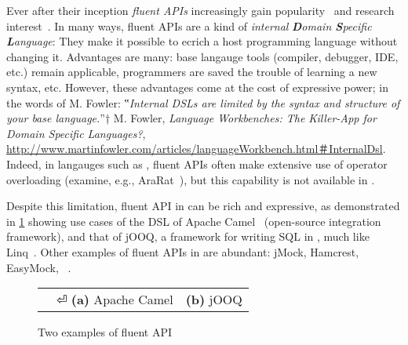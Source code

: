 Ever after their inception \emph{fluent APIs}
  increasingly gain popularity~\cite{Bauer:2005,Freeman:Pryce:06,Larsen:2012} and research
  interest~\cite{Deursen:2000,Kabanov:2008}.
In many ways, fluent APIs are a kind of
  \emph{internal} \emph{\textbf Domain \textbf Specific \textbf Language}:
They make it possible to ecrich a host programming language without changing it.
Advantages are many: base langauge tools (compiler, debugger, IDE, etc.) remain
  applicable, programmers are saved the trouble of learning a new syntax, etc.
However, these advantages come at the cost of expressive power;
  in the words of M. Fowler:
  ‟\emph{Internal DSLs are limited by the syntax and structure of your base language.}”†
  {M. Fowler,
    \emph{Language Workbenches: The Killer-App for Domain Specific Languages?},
  \url{http://www.martinfowler.com/articles/languageWorkbench.html＃InternalDsl}.}
Indeed, in langauges such as \CC{}, fluent APIs
  often make extensive use of operator overloading (examine, e.g., \textsf{AraRat}~\cite{Gil:Lenz:07}),
  but this capability is not available in \Java.

Despite this limitation, fluent API in \Java can be rich and expressive, as demonstrated
  in \cref{Figure:DSL} showing use cases of the DSL of Apache Camel~\cite{Ibsen:Anstey:10}
(open-source integration framework),
and that of jOOQ, a framework for writing
  SQL in \Java, much like Linq~\cite{Meijer:Beckman:Bierman:06}.
Other examples of fluent APIs in \Java are abundant: 
  jMock\cite{Freeman:Pryce:06}, 
  Hamcrest,
  EasyMock,
  ~\cite{find:manY:more:and:put:urlref:to:these}.

\begin{figure}[H]
  \caption{\label{Figure:DSL} Two examples of \Java fluent API}
  \begin{tabular}{@{}c@{}c@{}}
    \parbox[c]{44ex}{} &
    \hspace{-3ex} \parbox[c]{59ex}{} ⏎
    \textbf{(a)} Apache Camel                                          & \textbf{(b)} jOOQ
  \end{tabular}
\end{figure}

